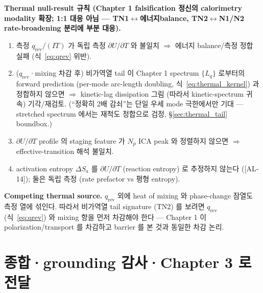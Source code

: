 \documentclass[11pt,a4paper]{article}
\newcommand{\rev}{\mathrm{rev}}
\newcommand{\AL}[1]{\textsf{[AL-#1]}}
\begin{document}
\textbf{Thermal null-result 규칙 (Chapter 1 falsification 정신의 calorimetry modality 확장; 1:1 대응
아님 — TN1$\leftrightarrow$에너지balance, TN2$\leftrightarrow$N1/N2 rate-broadening 분리에 부분 대응).}
\begin{enumerate}[label=(TN\arabic*)]
\item 측정 $q_\rev/(IT)$ 가 독립 측정 $\partial U/\partial T$ 와 불일치 $\Rightarrow$ 에너지
  balance/측정 정합 실패 (식~\eqref{eq:qrev} 위반).
\item ($q_\rev$·mixing 차감 후) 비가역열 tail 이 Chapter 1 spectrum $\{L_q\}$ 로부터의 forward
  prediction (per-mode arc-length doubling, 식~\eqref{eq:thermal_kernel}) 과 정합하지 않으면
  $\Rightarrow$ kinetic-lag dissipation 그림 (따라서 kinetic-spectrum 귀속) 기각/재검토. (``정확히
  2배 감쇠''는 단일 우세 mode 극한에서만 기대 — stretched spectrum 에서는 재척도 정합으로 검정,
  \S\ref{sec:thermal_tail} boundbox.)
\item $\partial U/\partial T$ profile 의 staging feature 가 $N_p$ ICA peak 와 정렬하지 않으면
  $\Rightarrow$ effective-transition 해석 불일치.
\item activation entropy $\Delta S_a$ 를 $\partial U/\partial T$ (reaction entropy) 로
  추정하지 않는다 (\AL{14}); 둘은 독립 측정 (rate prefactor vs 평형 entropy).
\end{enumerate}

\textbf{Competing thermal source.} $q_\rev$ 외에 heat of mixing \cite{thomasnewman2003} 와
phase-change 잠열도 측정 열에 섞인다. 따라서 비가역열 tail signature (TN2) 를 보려면 $q_\rev$
(식~\eqref{eq:qrev}) 와 mixing 항을 먼저 차감해야 한다 — Chapter 1 이 polarization/transport 를
차감하고 barrier 를 본 것과 동일한 차감 논리.

\section{종합·grounding 감사·Chapter 3 로 전달}\label{sec:summary}
\end{document}
